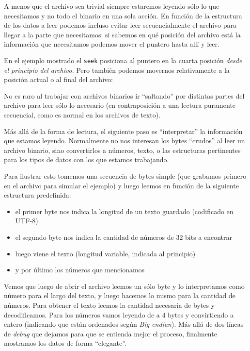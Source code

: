 
A menos que el archivo sea trivial siempre estaremos leyendo sólo lo que necesitamos y no todo el binario en una sola acción. En función de la estructura de los datos a leer podemos incluso evitar leer secuencialmente el archivo para llegar a la parte que necesitamos: si sabemos en qué posición del archivo está la información que necesitamos podemos mover el puntero hasta allí y leer.


En el ejemplo mostrado el \texttt{seek} posiciona al puntero en la cuarta posición \textit{desde el principio del archivo}. Pero también podemos movernos relativamente a la posición actual o al final del archivo:


No es raro al trabajar con archivos binarios ir ``saltando'' por distintas partes del archivo para leer sólo lo necesario (en contraposición a una lectura puramente secuencial, como es normal en los archivos de texto).

Más allá de la forma de lectura, el siguiente paso es ``interpretar'' la información que estamos leyendo. Normalmente no nos interesan los bytes ``crudos'' al leer un archivo binario, sino convertirlos a números, texto, o las estructuras pertinentes para los tipos de datos con los que estamos trabajando.

Para ilustrar esto tomemos una secuencia de bytes simple (que grabamos primero en el archivo para simular el ejemplo) y luego leemos en función de la siguiente estructura predefinida:

\begin{itemize}
    \item el primer byte nos indica la longitud de un texto guardado (codificado en UTF-8)
    \item el segundo byte nos indica la cantidad de números de 32 bits a encontrar
    \item luego viene el texto (longitud variable, indicada al principio)
    \item y por último los números que mencionamos
\end{itemize}


Vemos que luego de abrir el archivo leemos un sólo byte y lo interpretamos como número para el largo del texto, y luego hacemos lo mismo para la cantidad de números. Para obtener el texto leemos la cantidad necesaria de bytes y decodificamos. Para los números vamos leyendo de a 4 bytes y convirtiendo a entero (indicando que están ordenados según \textit{Big-endian}). Más allá de dos líneas de \textit{debug} que dejamos para que se entienda mejor el proceso, finalmente mostramos los datos de forma ``elegante''.

